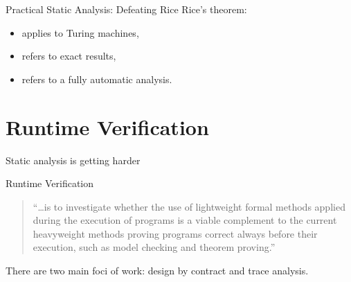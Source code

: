 \documentclass[12pt]{beamer}
\begin{document}
\begin{frame}{Practical Static Analysis: \small Defeating Rice}
  Rice's theorem:
  \begin{itemize}
    \item applies to Turing machines,
    \item refers to exact results,
    \item refers to a fully automatic analysis.
  \end{itemize}

\end{frame}


\section{Runtime Verification}
\label{sec:runver}

\begin{frame}
  \begin{center}
    \Large Static analysis is getting harder

  \end{center}
\end{frame}

\begin{frame}{Runtime Verification}

  \begin{quote}
    ``\ldots is to investigate whether the use of lightweight formal
    methods applied during the execution of programs is a viable
    complement to the current heavyweight methods proving programs
    correct always before their execution, such as model checking and
    theorem proving.''

  \end{quote}

  There are two main foci of work: design by contract and trace
  analysis.
\end{frame}
\end{document}
